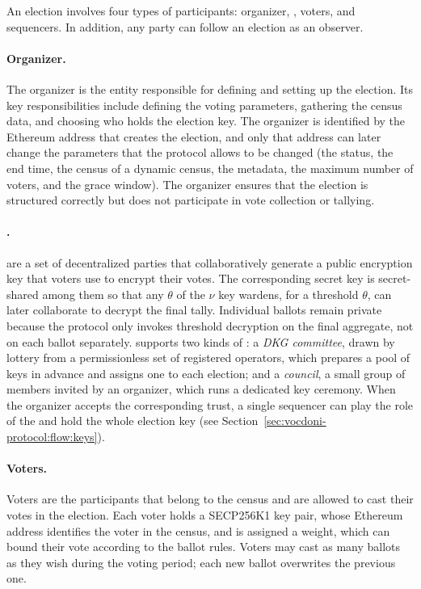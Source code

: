 
An election involves four types of participants: organizer, \keywardens, voters, and sequencers. In addition, any party can follow an election as an observer.

\paragraph{Organizer.} The organizer is the entity responsible for defining and setting up the election. Its key responsibilities include defining the voting parameters, gathering the census data, and choosing who holds the election key. The organizer is identified by the Ethereum address that creates the election, and only that address can later change the parameters that the protocol allows to be changed (the status, the end time, the census of a dynamic census, the metadata, the maximum number of voters, and the grace window). The organizer ensures that the election is structured correctly but does not participate in vote collection or tallying.

\paragraph{\Keywardens.} \Keywardens are a set of decentralized parties that collaboratively generate a public encryption key that voters use to encrypt their votes. The corresponding secret key is secret-shared among them so that any $\theta$ of the $\nu$ key wardens, for a threshold $\theta$, can later collaborate to decrypt the final tally. Individual ballots remain private because the protocol only invokes threshold decryption on the final aggregate, not on each ballot separately. \Davinci supports two kinds of \keywardens: a \emph{\ac{DKG} committee}, drawn by lottery from a permissionless set of registered operators, which prepares a pool of keys in advance and assigns one to each election; and a \emph{council}, a small group of members invited by an organizer, which runs a dedicated key ceremony. When the organizer accepts the corresponding trust, a single sequencer can play the role of the \keywardens and hold the whole election key (see Section~\ref{sec:vocdoni-protocol:flow:keys}).

\paragraph{Voters.} Voters are the participants that belong to the census and are allowed to cast their votes in the election. Each voter holds a SECP256K1 key pair, whose Ethereum address identifies the voter in the census, and is assigned a weight, which can bound their vote according to the ballot rules. Voters may cast as many ballots as they wish during the voting period; each new ballot overwrites the previous one.

